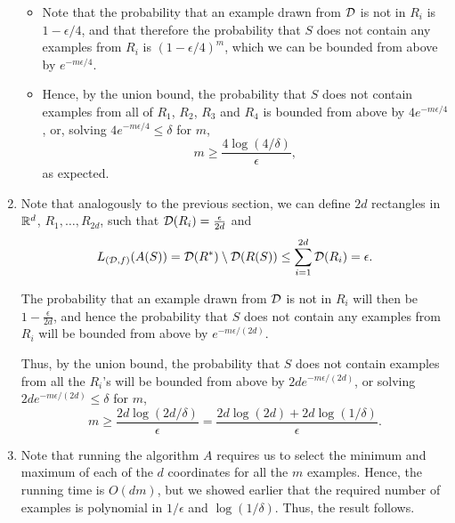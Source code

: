 \begin{ex}
\begin{enumerate}
\begin{itemize}
            \item Note that the probability that an example drawn from $\mathcal{D}$ is
                  not in $R_i$ is $1-\epsilon/4$, and that therefore the
                  probability that $S$ does not contain any examples from $R_i$
                  is $(1-\epsilon/4)^m$, which we can be bounded from above by
                  $e^{-m\epsilon/4}$.
            \item Hence, by the union bound, the probability that $S$ does not
                  contain examples from all of $R_1$, $R_2$, $R_3$ and $R_4$ is
                  bounded from above by $4e^{-m\epsilon/4}$,
                  or, solving $4e^{-m\epsilon/4}\leq \delta$ for $m$,
                  \[
                    m\geq \frac{4\log(4/\delta)}{\epsilon},
                  \]
                  as expected.
          \end{itemize}
    \item Note that analogously to the previous section, we can define $2d$
          rectangles in $\mathbb{R}^d$, $R_1,\ldots,R_{2d}$, such that
          $\mathcal{D}(R_i)=\frac{\epsilon}{2d}$ and
          \begin{align*}
            L_{(\mathcal{D},f)}(A(S))
            =\mathcal{D}(R^*)\setminus \mathcal{D}(R(S))
            \leq \sum_{i=1}^{2d}\mathcal{D}(R_i)
            =\epsilon.
          \end{align*}

          The probability that an example drawn from $\mathcal{D}$ is not in $R_i$ will
          then be $1-\frac{\epsilon}{2d}$, and hence the probability that $S$
          does not contain any examples from $R_i$ will be bounded from above by
          $e^{-m\epsilon/(2d)}$.

          Thus, by the union bound, the probability that $S$ does not contain
          examples from all the $R_i$'s will be bounded from above by
          $2de^{-m\epsilon/(2d)}$, or solving
          $2de^{-m\epsilon/(2d)}\leq \delta$ for $m$,
          \[
            m\geq \frac{2d\log(2d/\delta)}{\epsilon}
            =\frac{2d\log(2d)+2d\log(1/\delta)}{\epsilon}.
          \]
    \item Note that running the algorithm $A$ requires us to select the minimum
          and maximum of each of the $d$ coordinates for all the $m$ examples.
          Hence, the running time is $O(dm)$, but we showed earlier that the
          required number of examples is polynomial in $1/\epsilon$ and
          $\log(1/\delta)$. Thus, the result follows.
  \end{enumerate}
\end{ex}
